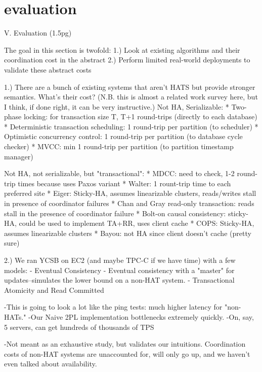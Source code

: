 
\section{evaluation}

V. Evaluation (1.5pg)

The goal in this section is twofold:
1.) Look at existing algorithms and their coordination cost in the abstract
2.) Perform limited real-world deployments to validate these abstract costs

1.) There are a bunch of existing systems that aren't HATS but provide stronger semantics. What's their cost? (N.B. this is almost a related work survey here, but I think, if done right, it can be very instructive.)
Not HA, Serializable:
* Two-phase locking: for transaction size T, T+1 round-trips (directly to each database)
* Deterministic transaction scheduling: 1 round-trip per partition (to scheduler)
* Optimistic concurrency control: 1 round-trip per partition (to database cycle checker)
* MVCC: min 1 round-trip per partition (to partition timestamp manager)

Not HA, not serializable, but "transactional":
* MDCC: need to check, 1-2 round-trip times because uses Paxos variant
* Walter: 1 rount-trip time to each preferred site
* Eiger: Sticky-HA, assumes linearizable clusters, reads/writes stall in presence of coordinator failures
* Chan and Gray read-only transaction: reads stall in the presence of coordinator failure
* Bolt-on causal consistency: sticky-HA, could be used to implement TA+RR, uses client cache
* COPS: Sticky-HA, assumes linearizable clusters
* Bayou: not HA since client doesn't cache (pretty sure)

2.) We ran YCSB on EC2 (and maybe TPC-C if we have time) with a few models:
	- Eventual Consistency
	- Eventual consistency with a "master" for updates--simulates the lower bound on a non-HAT system.
	- Transactional Atomicity and Read Committed
	
	-This is going to look a lot like the ping tests: much higher latency for "non-HATs."
	-Our Naive 2PL implementation bottlenecks extremely quickly.
	-On, say, 5 servers, can get hundreds of thousands of TPS

	-Not meant as an exhaustive study, but validates our intuitions. Coordination costs of non-HAT systems are unaccounted for, will only go up, and we haven't even talked about availability.
